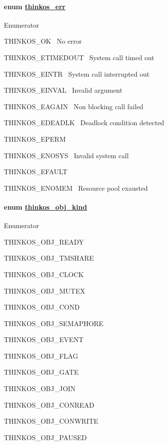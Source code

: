 {\paragraph{\texorpdfstring{{enum
}{\protect\hyperlink{h.40ew0vw}{thinkos\_err}}}{enum thinkos\_err}}\label{enum-thinkos_err}

{\protect\hyperlink{AAAAAAAAAM}{}}

{Enumerator}

{THINKOS\_OK}{~ No error }

{THINKOS\_ETIMEDOUT}{~ System call timed out }

{THINKOS\_EINTR}{~ System call interrupted out }

{THINKOS\_EINVAL}{~ Invalid argument }

{THINKOS\_EAGAIN}{~ Non blocking call failed }

{THINKOS\_EDEADLK}{~ Deadlock condition detected }

{THINKOS\_EPERM}{~ }

{THINKOS\_ENOSYS}{~ Invalid system call }

{THINKOS\_EFAULT}{~ }

{THINKOS\_ENOMEM}{~ Resource pool exausted }

\paragraph{\texorpdfstring{{enum
}{\protect\hyperlink{h.36ei31r}{thinkos\_obj\_kind}}}{enum thinkos\_obj\_kind}}\label{enum-thinkos_obj_kind}

{\protect\hyperlink{AAAAAAAAAX}{}}

{Enumerator}

{THINKOS\_OBJ\_READY}{~ }

{THINKOS\_OBJ\_TMSHARE}{~ }

{THINKOS\_OBJ\_CLOCK}{~ }

{THINKOS\_OBJ\_MUTEX}{~ }

{THINKOS\_OBJ\_COND}{~ }

{THINKOS\_OBJ\_SEMAPHORE}{~ }

{THINKOS\_OBJ\_EVENT}{~ }

{THINKOS\_OBJ\_FLAG}{~ }

{THINKOS\_OBJ\_GATE}{~ }

{THINKOS\_OBJ\_JOIN}{~ }

{THINKOS\_OBJ\_CONREAD}{~ }

{THINKOS\_OBJ\_CONWRITE}{~ }

{THINKOS\_OBJ\_PAUSED}{~ }

}
